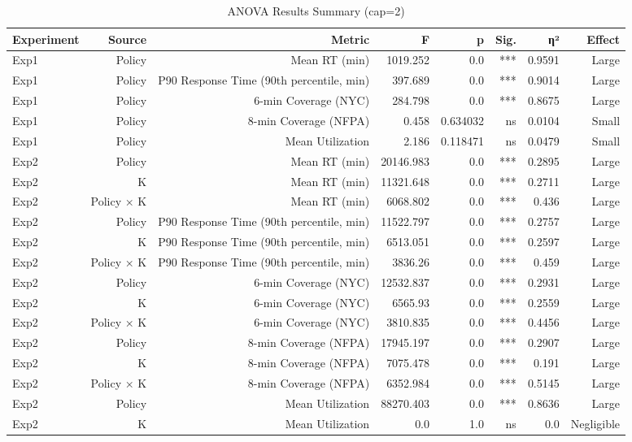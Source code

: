 \begin{table}[htbp]
\centering
\caption{ANOVA Results Summary (cap=2)}
\label{tab:anova}
\begin{tabular}{lrrrrrrr}
\toprule
Experiment & Source & Metric & F & p & Sig. & η² & Effect \\
\midrule
Exp1 & Policy & Mean RT (min) & 1019.252 & 0.0 & *** & 0.9591 & Large \\
Exp1 & Policy & P90 Response Time (90th percentile, min) & 397.689 & 0.0 & *** & 0.9014 & Large \\
Exp1 & Policy & 6-min Coverage (NYC) & 284.798 & 0.0 & *** & 0.8675 & Large \\
Exp1 & Policy & 8-min Coverage (NFPA) & 0.458 & 0.634032 & ns & 0.0104 & Small \\
Exp1 & Policy & Mean Utilization & 2.186 & 0.118471 & ns & 0.0479 & Small \\
Exp2 & Policy & Mean RT (min) & 20146.983 & 0.0 & *** & 0.2895 & Large \\
Exp2 & K & Mean RT (min) & 11321.648 & 0.0 & *** & 0.2711 & Large \\
Exp2 & Policy × K & Mean RT (min) & 6068.802 & 0.0 & *** & 0.436 & Large \\
Exp2 & Policy & P90 Response Time (90th percentile, min) & 11522.797 & 0.0 & *** & 0.2757 & Large \\
Exp2 & K & P90 Response Time (90th percentile, min) & 6513.051 & 0.0 & *** & 0.2597 & Large \\
Exp2 & Policy × K & P90 Response Time (90th percentile, min) & 3836.26 & 0.0 & *** & 0.459 & Large \\
Exp2 & Policy & 6-min Coverage (NYC) & 12532.837 & 0.0 & *** & 0.2931 & Large \\
Exp2 & K & 6-min Coverage (NYC) & 6565.93 & 0.0 & *** & 0.2559 & Large \\
Exp2 & Policy × K & 6-min Coverage (NYC) & 3810.835 & 0.0 & *** & 0.4456 & Large \\
Exp2 & Policy & 8-min Coverage (NFPA) & 17945.197 & 0.0 & *** & 0.2907 & Large \\
Exp2 & K & 8-min Coverage (NFPA) & 7075.478 & 0.0 & *** & 0.191 & Large \\
Exp2 & Policy × K & 8-min Coverage (NFPA) & 6352.984 & 0.0 & *** & 0.5145 & Large \\
Exp2 & Policy & Mean Utilization & 88270.403 & 0.0 & *** & 0.8636 & Large \\
Exp2 & K & Mean Utilization & 0.0 & 1.0 & ns & 0.0 & Negligible \\

\end{tabular}
\end{table}
